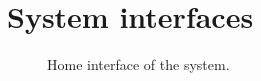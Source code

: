 \chapter{System interfaces}\label{appendixd}

\begin{figure}[ht!]
   \captionsetup{font=footnotesize}
   \centering
   \hspace{0.01\linewidth}
   \caption{Home interface of the system.
   }
   \label{fig:home} 
\end{figure}

